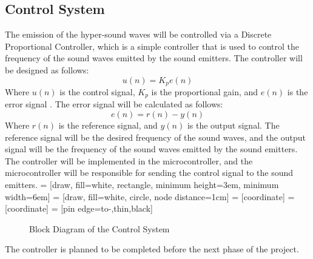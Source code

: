 \documentclass[12pt]{article}
\numberwithin{equation}{section}
\begin{document}
\subsection{Control System}
The emission of the hyper-sound waves will be controlled via a Discrete Proportional Controller, which is a simple controller that is used to control the frequency of the sound waves emitted by the sound emitters. The controller will be designed as follows:
\begin{equation}
  u(n) = K_p e(n)
\end{equation}
Where $u(n)$ is the control signal, $K_p$ is the proportional gain, and $e(n)$ is the error signal \cite{Oppenheim2013Discrete}. The error signal will be calculated as follows:
\begin{equation}
  e(n) = r(n) - y(n)
\end{equation}
Where $r(n)$ is the reference signal, and $y(n)$ is the output signal. The reference signal will be the desired frequency of the sound waves, and the output signal will be the frequency of the sound waves emitted by the sound emitters. The controller will be implemented in the microcontroller, and the microcontroller will be responsible for sending the control signal to the sound emitters.
 = [draw, fill=white, rectangle, 
    minimum height=3em, minimum width=6em]
 = [draw, fill=white, circle, node distance=1cm]
 = [coordinate]
 = [coordinate]
 = [pin edge={to-,thin,black}]

\begin{figure}[H]
  \centering
  \caption{Block Diagram of the Control System}
\end{figure}
The controller is planned to be completed before the next phase of the project.
\end{document}

